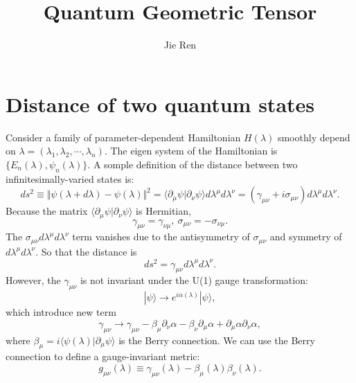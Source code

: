 \documentclass[aps,prb,superscriptaddress]{revtex4}
\begin{document}
\title{Quantum Geometric Tensor}
\author{Jie Ren}
\maketitle


\section{Distance of two quantum states}
Consider a family of parameter-dependent Hamiltonian $H(\lambda)$ smoothly depend on $\lambda = (\lambda_1,\lambda_2,\cdots, \lambda_n)$. The eigen system of the Hamiltonian is $\{E_n(\lambda), \psi_n(\lambda)\}$. A somple definition of the distance between two infinitesimally-varied states is:
\begin{equation}
	ds^2 \equiv \Vert \psi(\lambda+d\lambda)-\psi(\lambda) \Vert^2
	= \langle\partial_\mu \psi | \partial_\nu \psi \rangle d\lambda^\mu d\lambda^\nu
	= (\gamma_{\mu\nu}+i\sigma_{\mu\nu})d\lambda^\mu d\lambda^\nu.
\end{equation}
Because the matrix $ \langle\partial_\mu \psi | \partial_\nu \psi \rangle$ is Hermitian,
\begin{equation}
	\gamma_{\mu\nu} = \gamma_{\nu\mu},\ \sigma_{\mu\nu}=-\sigma_{\nu\mu}.
\end{equation}
The $\sigma_{\mu\nu} d \lambda^\mu d \lambda^\nu$ term vanishes due to the antisymmetry of $\sigma_{\mu\nu}$ and symmetry of $d \lambda^\mu d\lambda^\nu$. So that the distance is
\begin{equation}
	ds^2 = \gamma_{\mu\nu} d\lambda^\mu d\lambda^\nu.
\end{equation}
However, the $\gamma_{\mu\nu}$ is not invariant under the U(1) gauge transformation:
\begin{equation}
	|\psi\rangle \longrightarrow e^{i\alpha(\lambda)}|\psi\rangle,
\end{equation}
which introduce new term
\begin{equation}
	\gamma_{\mu\nu} \longrightarrow \gamma_{\mu\nu}-\beta_\mu \partial_\nu \alpha - \beta_\nu \partial_\mu \alpha + \partial_\mu \alpha \partial_\nu \alpha,
\end{equation}
where $\beta_\mu = i \langle \psi(\lambda)|\partial_\mu \psi \rangle$ is the Berry connection. We can use the Berry connection to define a gauge-invariant metric:
\begin{equation}
	g_{\mu\nu}(\lambda) \equiv \gamma_{\mu\nu}(\lambda) - \beta_\mu(\lambda) \beta_\nu(\lambda).
\end{equation}
\end{document}
